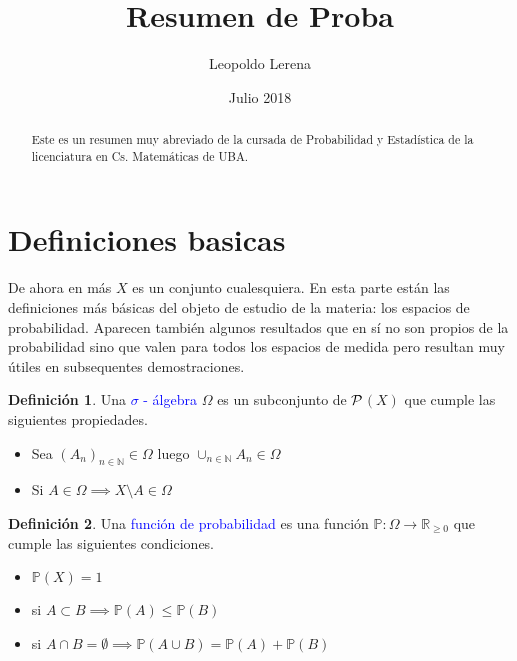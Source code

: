 \documentclass[11pt]{article}
\theoremstyle{plain} %
\theoremstyle{definition}
\newtheorem*{definicion}{Definici\'{o}n} %
\theoremstyle{remark}
\def\Om{\Omega}
\def\R{\mathbb{R}}
\def\N{\mathbb{N}}
\def\P{\mathbb{P}}
\def\blue{\textcolor{blue}}
\begin{document}
\title{Resumen de Proba}
\author{Leopoldo Lerena}
\date{Julio 2018}
\maketitle

\begin{abstract}
	Este es un resumen muy abreviado de la cursada de Probabilidad y Estad\'{i}stica de la licenciatura en Cs. Matem\'{a}ticas de UBA.
\end{abstract}


\tableofcontents


\eject



\bigskip 










\section{Definiciones basicas}
\label{sec:discretos}

De ahora en m\'as $X$ es un conjunto cualesquiera. En esta parte están las definiciones más básicas del objeto de estudio de la materia: los espacios de probabilidad. Aparecen también algunos resultados que en sí no son propios de la probabilidad sino que valen para todos los espacios de medida pero resultan muy útiles en subsequentes demostraciones.

\begin{definicion}
	Una \blue{$\sigma$ - \'algebra} $\Omega$ es un subconjunto de $\cal{P}$$(X)$ que cumple las siguientes propiedades.
	\begin{itemize}
		\item Sea $(A_n)_{n \in \N} \in \Omega$ luego $\cup_{n \in \N} A_{n} \in \Om$
		\item Si $A \in \Om \implies X\setminus A \in \Om$
	\end{itemize}
\end{definicion}

\begin{definicion}
	Una \blue{funci\'on de probabilidad}  es una funci\'on $\mathbb P: \Om \to \R_{\geq 0}$ que cumple las siguientes condiciones.
	\begin{itemize}
		\item  $\P(X) = 1$
		\item si $A \subset B \implies \P(A) \leq \P(B)$
		\item si $A \cap B = \emptyset \implies \P(A \cup B) = \P(A) + \P(B)$
	\end{itemize}
\end{definicion}
\end{document}
